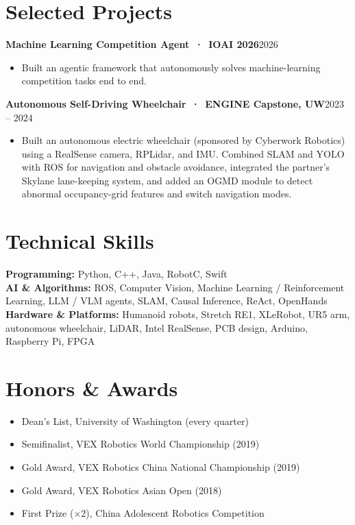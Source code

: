 \documentclass[10pt,letterpaper]{article}
\newcommand{\entryb}[2]{\noindent\textbf{#1}\hfill {\color{muted}\small #2}}
\begin{document}
\section{Selected Projects}
\entryb{Machine Learning Competition Agent \,·\, IOAI 2026}{2026}
\begin{itemize}
\item Built an agentic framework that autonomously solves machine-learning competition tasks end to end.
\end{itemize}

\entryb{Autonomous Self-Driving Wheelchair \,·\, ENGINE Capstone, UW}{2023 -- 2024}
\begin{itemize}
\item Built an autonomous electric wheelchair (sponsored by Cyberwork Robotics) using a RealSense camera, RPLidar, and IMU. Combined SLAM and YOLO with ROS for navigation and obstacle avoidance, integrated the partner's Skylane lane-keeping system, and added an OGMD module to detect abnormal occupancy-grid features and switch navigation modes.
\end{itemize}

\section{Technical Skills}
\textbf{Programming:} Python, C++, Java, RobotC, Swift\\
\textbf{AI \& Algorithms:} ROS, Computer Vision, Machine Learning / Reinforcement Learning, LLM / VLM agents, SLAM, Causal Inference, ReAct, OpenHands\\
\textbf{Hardware \& Platforms:} Humanoid robots, Stretch RE1, XLeRobot, UR5 arm, autonomous wheelchair, LiDAR, Intel RealSense, PCB design, Arduino, Raspberry Pi, FPGA

\section{Honors \& Awards}
\begin{itemize}
\item Dean's List, University of Washington (every quarter)
\item Semifinalist, VEX Robotics World Championship (2019)
\item Gold Award, VEX Robotics China National Championship (2019)
\item Gold Award, VEX Robotics Asian Open (2018)
\item First Prize (×2), China Adolescent Robotics Competition
\end{itemize}
\end{document}
